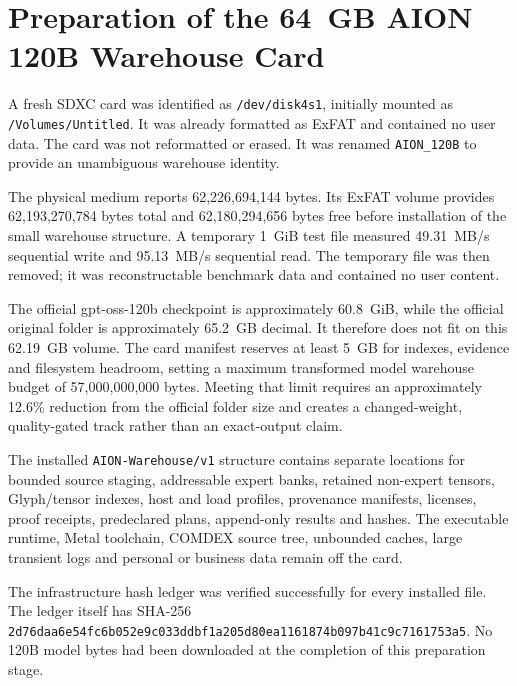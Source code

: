 \section{Preparation of the 64~GB AION 120B Warehouse Card}
\label{sec:gpt-oss-120b-card-preparation}

A fresh SDXC card was identified as \texttt{/dev/disk4s1}, initially mounted
as \texttt{/Volumes/Untitled}.  It was already formatted as ExFAT and contained
no user data.  The card was not reformatted or erased.  It was renamed
\texttt{AION\_120B} to provide an unambiguous warehouse identity.

The physical medium reports 62,226,694,144 bytes.  Its ExFAT volume provides
62,193,270,784 bytes total and 62,180,294,656 bytes free before installation of
the small warehouse structure.  A temporary 1~GiB test file measured
49.31~MB/s sequential write and 95.13~MB/s sequential read.  The temporary file
was then removed; it was reconstructable benchmark data and contained no user
content.

The official gpt-oss-120b checkpoint is approximately 60.8~GiB, while the
official original folder is approximately 65.2~GB decimal.  It therefore does
not fit on this 62.19~GB volume.  The card manifest reserves at least 5~GB for
indexes, evidence and filesystem headroom, setting a maximum transformed model
warehouse budget of 57,000,000,000 bytes.  Meeting that limit requires an
approximately 12.6\% reduction from the official folder size and creates a
changed-weight, quality-gated track rather than an exact-output claim.

The installed \texttt{AION-Warehouse/v1} structure contains separate locations
for bounded source staging, addressable expert banks, retained non-expert
tensors, Glyph/tensor indexes, host and load profiles, provenance manifests,
licenses, proof receipts, predeclared plans, append-only results and hashes.
The executable runtime, Metal toolchain, COMDEX source tree, unbounded caches,
large transient logs and personal or business data remain off the card.

The infrastructure hash ledger was verified successfully for every installed
file.  The ledger itself has SHA-256
\texttt{2d76daa6e54fc6b052e9c033ddbf1a205d80ea1161874b097b41c9c7161753a5}.
No 120B model bytes had been downloaded at the completion of this preparation
stage.

